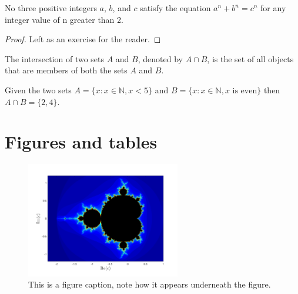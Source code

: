 \begin{theorem}
    No three positive integers $a$, $b$, and $c$ satisfy the equation $a^n + b^n = c^n$ for any integer value of n greater than 2.
\end{theorem}

\begin{proof}
    Left as an exercise for the reader.
\end{proof}

\begin{definition}
    The intersection of two sets $A$ and $B$, denoted by $A \cap B$, is the set of all objects that are members of both the sets $A$ and $B$.
\end{definition}

\begin{example}
    Given the two sets $A = \{x:x\in \mathbb{N}, x < 5\}$ and $B = \{x:x \in \mathbb{N}, x \text{ is even}\}$ then $A \cap B = \{2, 4\}$.
\end{example}


\section{Figures and tables}

\begin{figure}[H]
    \begin{center}
        \includegraphics[width = 0.6\textwidth]{Images/mandelbrot} %
        \caption{This is a figure caption, note how it appears underneath the figure.} %
        \label{fig:figure label} %
    \end{center}
\end{figure}

